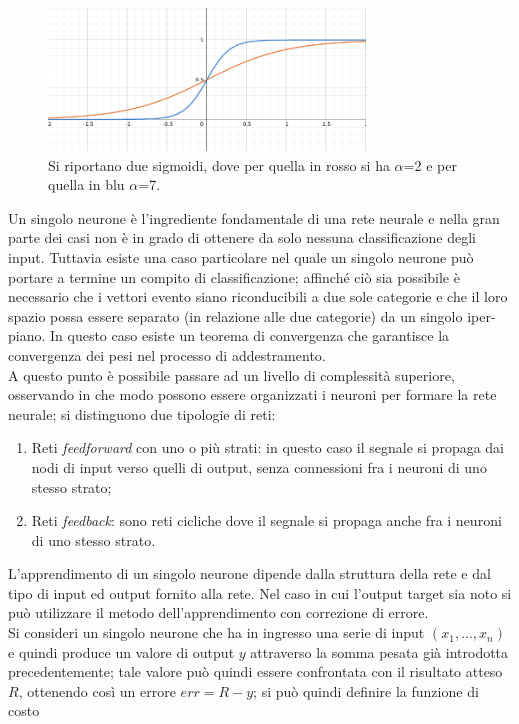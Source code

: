 \begin{figure}[h!]
	\centering
	\includegraphics[width=0.75\textwidth]{figs/sigmoide.png}
	\caption{Si riportano due sigmoidi, dove per quella in rosso si ha $\alpha$=2 e per quella in blu $\alpha$=7.}
	\label{sigmoide}
\end{figure}
\newpage
Un singolo neurone è l'ingrediente fondamentale di una rete neurale e nella gran parte dei casi non è in grado di ottenere da solo nessuna classificazione degli input. Tuttavia esiste una caso particolare nel quale un singolo neurone può portare a termine un compito di classificazione; affinché ciò sia possibile è necessario che i vettori evento siano riconducibili a due sole categorie e che il loro spazio possa essere separato (in relazione alle due categorie) da un singolo iper-piano. In questo caso esiste un teorema di convergenza che garantisce la convergenza dei pesi nel processo di addestramento.\\
A questo punto è possibile passare ad un livello di complessità superiore, osservando in che modo possono essere organizzati i neuroni per formare la rete neurale; si distinguono due tipologie di reti:
\begin{enumerate}
	\item Reti \textit{feedforward} con uno o più strati: in questo caso il segnale si propaga dai nodi di input verso quelli di output, senza connessioni fra i neuroni di uno stesso strato;
	\item Reti \textit{feedback}: sono reti cicliche dove il segnale si propaga anche fra i neuroni di uno stesso strato.
\end{enumerate}
L'apprendimento di un singolo neurone dipende dalla struttura della rete e dal tipo di input ed output fornito alla rete. Nel caso in cui l'output target sia noto si può utilizzare il metodo dell'apprendimento con correzione di errore. \\
Si consideri un singolo neurone che ha in ingresso una serie di input $(x_1,...,x_n)$ e quindi produce un valore di output $y$ attraverso la somma pesata già introdotta precedentemente; tale valore può quindi essere confrontata con il risultato atteso $R$, ottenendo così un errore $err = R - y$; si può quindi definire la funzione di costo
